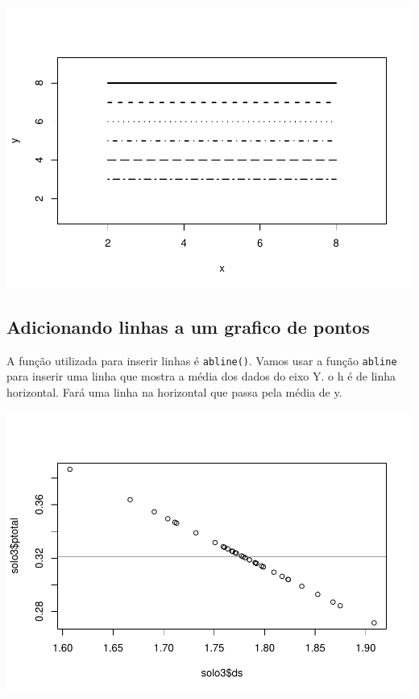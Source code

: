 \documentclass[
]{book}
\newenvironment{Shaded}{\begin{snugshade}}{\end{snugshade}}
\newcommand{\DataTypeTok}[1]{\textcolor[rgb]{0.13,0.29,0.53}{#1}}
\newcommand{\KeywordTok}[1]{\textcolor[rgb]{0.13,0.29,0.53}{\textbf{#1}}}
\newcommand{\NormalTok}[1]{#1}
\newcommand{\OperatorTok}[1]{\textcolor[rgb]{0.81,0.36,0.00}{\textbf{#1}}}
\begin{document}
\includegraphics{TudodoR_files/figure-latex/unnamed-chunk-159-1.pdf}

\hypertarget{adicionando-linhas-a-um-grafico-de-pontos}{%
\subsection{Adicionando linhas a um grafico de pontos}\label{adicionando-linhas-a-um-grafico-de-pontos}}

A função utilizada para inserir linhas é \texttt{abline()}.
Vamos usar a função \texttt{abline} para inserir uma linha que mostra a média dos dados do eixo Y.
o h é de linha horizontal. Fará uma linha na horizontal que passa pela média de y.

\begin{Shaded}
\end{Shaded}

\includegraphics{TudodoR_files/figure-latex/unnamed-chunk-160-1.pdf}
\end{document}
